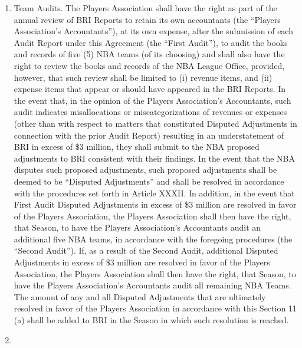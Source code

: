 \documentclass[
]{book}
\providecommand{\tightlist}{%
  \setlength{\itemsep}{0pt}\setlength{\parskip}{0pt}}
\begin{document}
\begin{enumerate}
\def\labelenumi{(\alph{enumi})}
\tightlist
\item
  Team Audits. The Players Association shall have the right as part of the annual review of BRI Reports to retain its own accountants (the ``Players Association's Accountants''), at its own expense, after the submission of each Audit Report under this Agreement (the ``First Audit''), to audit the books and records of five (5) NBA teams (of its choosing) and shall also have the right to review the books and records of the NBA League Office, provided, however, that such review shall be limited to (i) revenue items, and (ii) expense items that appear or should have appeared in the BRI Reports. In the event that, in the opinion of the Players Association's Accountants, such audit indicates misallocations or miscategorizations of revenues or expenses (other than with respect to matters that constituted Disputed Adjustments in connection with the prior Audit Report) resulting in an understatement of BRI in excess of \$3 million, they shall submit to the NBA proposed adjustments to BRI consistent with their findings. In the event that the NBA disputes such proposed adjustments, such proposed adjustments shall be deemed to be ``Disputed Adjustments'' and shall be resolved in accordance with the procedures set forth in Article XXXII. In addition, in the event that First Audit Disputed Adjustments in excess of \$3 million are resolved in favor of the Players Association, the Players Association shall then have the right, that Season, to have the Players Association's Accountants audit an additional five NBA teams, in accordance with the foregoing procedures (the ``Second Audit''). If, as a result of the Second Audit, additional Disputed Adjustments in excess of \$3 million are resolved in favor of the Players Association, the Players Association shall then have the right, that Season, to have the Players Association's Accountants audit all remaining NBA Teams. The amount of any and all Disputed Adjustments that are ultimately resolved in favor of the Players Association in accordance with this Section 11 (a) shall be added to BRI in the Season in which such resolution is reached.
\item

\end{enumerate}
\end{document}
